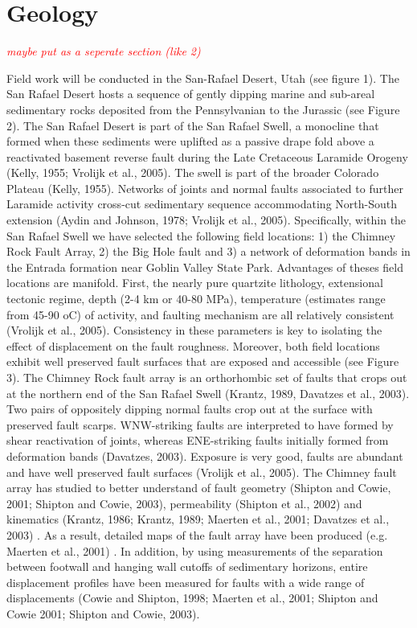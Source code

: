 \documentclass[12pt,a4paper]{article}
\begin{document}
\section{Geology}

\textcolor{red}{\textit{maybe put as a seperate section (like 2)}}

Field work will be conducted in the San-Rafael Desert, Utah (see figure 1). The San Rafael Desert hosts a sequence of gently dipping marine and sub-areal sedimentary rocks deposited from the Pennsylvanian to the Jurassic (see Figure 2). 
The San Rafael Desert is part of the San Rafael Swell, a monocline that formed when these sediments were uplifted as a passive drape fold above a reactivated basement reverse fault during the Late Cretaceous Laramide Orogeny (Kelly, 1955; Vrolijk et al., 2005). The swell is part of the broader Colorado Plateau (Kelly, 1955). Networks of joints and normal faults associated to further Laramide activity cross-cut sedimentary sequence accommodating North-South extension (Aydin and Johnson, 1978; Vrolijk et al., 2005). Specifically, within the San Rafael Swell we have selected the following field locations: 1) the Chimney Rock Fault Array, 2) the Big Hole fault and 3) a network of deformation bands in the Entrada formation near Goblin Valley State Park.  Advantages of theses field locations are manifold. First, the nearly pure quartzite lithology, extensional tectonic regime, depth (2-4 km or 40-80 MPa), temperature (estimates range from 45-90 oC) of activity, and faulting mechanism are all relatively consistent (Vrolijk et al., 2005). Consistency in these parameters is key to isolating the effect of displacement on the fault roughness. Moreover, both field locations exhibit well preserved fault surfaces that are exposed and accessible (see Figure 3). 
The Chimney Rock fault array is an orthorhombic set of faults that crops out at the northern end of the San Rafael Swell (Krantz, 1989, Davatzes et al., 2003). Two pairs of oppositely dipping normal faults crop out at the surface with preserved fault scarps. WNW-striking faults are interpreted to have formed by shear reactivation of joints, whereas ENE-striking faults initially formed from deformation bands (Davatzes, 2003). Exposure is very good, faults are abundant and have well preserved fault surfaces (Vrolijk et al., 2005). The Chimney fault array has studied to better understand of fault geometry (Shipton and Cowie, 2001; Shipton and Cowie, 2003), permeability (Shipton et al., 2002) and kinematics (Krantz, 1986; Krantz, 1989; Maerten et al., 2001; Davatzes et al., 2003) . As a result, detailed maps of the fault array have been produced (e.g. Maerten et al., 2001) . In addition, by using measurements of the separation between footwall and hanging wall cutoffs of sedimentary horizons, entire displacement profiles have been measured for faults with a wide range of displacements (Cowie and Shipton, 1998; Maerten et al., 2001; Shipton and Cowie 2001; Shipton and Cowie, 2003). 
\end{document}
